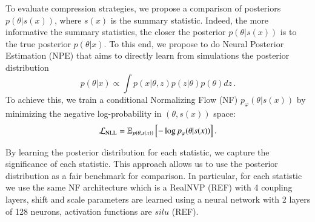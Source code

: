 \documentclass{aa}
\begin{document}
To evaluate compression strategies, we propose a comparison of posteriors $p(\theta|s(x))$, where $s(x)$ is the summary statistic. Indeed, the more informative the summary statistics, the closer the posterior $p(\theta | s(x))$ is to the true posterior $p (\theta | x)$. To this end, we propose to do Neural Posterior Estimation (NPE)  that aims to directly learn from simulations the posterior distribution
\begin{equation}
    p(\theta | x) \propto \int p(x | \theta, z) p(z|\theta) p(\theta) dz\,.
\end{equation}
To achieve this, we train a  conditional Normalizing Flow (NF)  $p_{\varphi} (\theta | s(x)) $ by minimizing the negative log-probability in $(\theta, s(x))$ space:
\begin{equation}
    \mathcal{L}_{\rm NLL} = \mathbb{E}_{p(\theta, s(x))} \left[ - \log p_{\varphi} (\theta | s(x))  \right].
    \label{eq:nll}
\end{equation}


By learning the posterior distribution for each statistic, we capture the significance of each statistic. This approach allows us to use the posterior distribution as a fair benchmark for comparison.
In particular, for each statistic we use the same NF architecture which is a RealNVP (REF) with 4 coupling layers, shift and scale parameters are learned using a neural network with 2 layers of 128 neurons, activation functions are $silu$ (REF).
\end{document}
